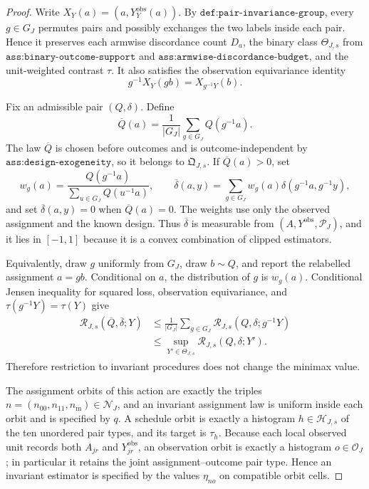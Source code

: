 \documentclass{article}
\begin{document}
\begin{proof}
Write \(X_Y(a)=(a,Y_Y^{\mathrm{obs}}(a))\). By \(\texttt{def:pair-invariance-group}\), every \(g\in G_J\) permutes pairs and possibly exchanges the two labels inside each pair. Hence it preserves each armwise discordance count \(D_a\), the binary class \(\Theta_{J,s}\) from \(\texttt{ass:binary-outcome-support}\) and \(\texttt{ass:armwise-discordance-budget}\), and the unit-weighted contrast \(\tau\). It also satisfies the observation equivariance identity
\[
 g^{-1}X_Y(gb)=X_{g^{-1}Y}(b).
\]

Fix an admissible pair \((Q,\delta)\). Define
\[
 \overline Q(a)=\frac1{|G_J|}\sum_{g\in G_J}Q(g^{-1}a).
\]
The law \(\overline Q\) is chosen before outcomes and is outcome-independent by \(\texttt{ass:design-exogeneity}\), so it belongs to \(\mathfrak Q_{J,s}\). If \(\overline Q(a)>0\), set
\[
 w_g(a)=\frac{Q(g^{-1}a)}{\sum_{u\in G_J}Q(u^{-1}a)},
 \qquad
 \overline\delta(a,y)=\sum_{g\in G_J}w_g(a)\delta(g^{-1}a,g^{-1}y),
\]
and set \(\overline\delta(a,y)=0\) when \(\overline Q(a)=0\). The weights use only the observed assignment and the known design. Thus \(\overline\delta\) is measurable from \((A,Y^{\mathrm{obs}},\mathcal P_J)\), and it lies in \([-1,1]\) because it is a convex combination of clipped estimators.

Equivalently, draw \(g\) uniformly from \(G_J\), draw \(b\sim Q\), and report the relabelled assignment \(a=gb\). Conditional on \(a\), the distribution of \(g\) is \(w_g(a)\). Conditional Jensen inequality for squared loss, observation equivariance, and \(\tau(g^{-1}Y)=\tau(Y)\) give
\[
\begin{aligned}
 \mathcal R_{J,s}(\overline Q,\overline\delta;Y)
 &\le \frac1{|G_J|}\sum_{g\in G_J}
 \mathcal R_{J,s}(Q,\delta;g^{-1}Y)\\
 &\le \sup_{Y'\in\Theta_{J,s}}\mathcal R_{J,s}(Q,\delta;Y').
\end{aligned}
\]
Therefore restriction to invariant procedures does not change the minimax value.

The assignment orbits of this action are exactly the triples \(n=(n_{00},n_{11},n_{\mathrm m})\in\mathcal N_J\), and an invariant assignment law is uniform inside each orbit and is specified by \(q\). A schedule orbit is exactly a histogram \(h\in\mathcal H_{J,s}\) of the ten unordered pair types, and its target is \(\tau_h\). Because each local observed unit records both \(A_{jr}\) and \(Y^{\mathrm{obs}}_{jr}\), an observation orbit is exactly a histogram \(o\in\mathcal O_J\); in particular it retains the joint assignment--outcome pair type. Hence an invariant estimator is specified by the values \(\eta_{no}\) on compatible orbit cells.


\end{proof}
\end{document}
